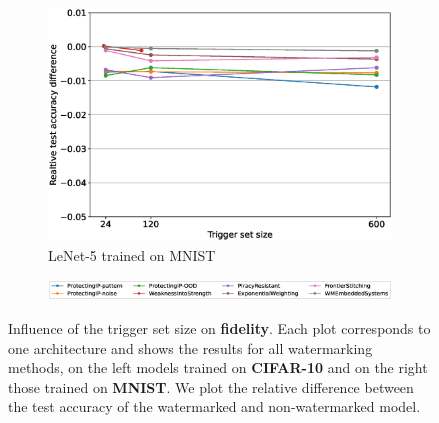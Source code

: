 \begin{figure}
\begin{subfigure}{0.4\linewidth}
        \includegraphics[width=\linewidth]{images/fidelity/lenet5_fidelity_rel_per_arch.eps}
        \caption{LeNet-5 trained on MNIST}
        \label{fig:fidelity-lenet5}
    \end{subfigure}
    \quad
    
    \begin{subfigure}{\linewidth}
    \centering
    \includegraphics[width=0.7\linewidth]{images/fidelity/legend_fidelity_rel_per_arch.eps}
    \end{subfigure}
    
    \caption{Influence of the trigger set size on \textbf{fidelity}. Each plot corresponds to one architecture and shows the results for all watermarking methods, on the left models trained on \textbf{CIFAR-10} and on the right those trained on \textbf{MNIST}. We plot the relative difference between the test accuracy of the watermarked and non-watermarked model.}
    \label{fig:fidelity-perarch}
\end{figure}
